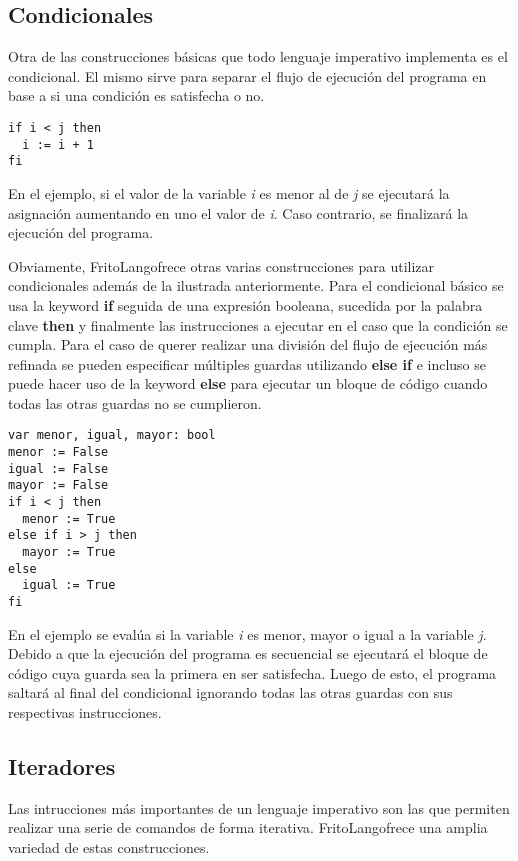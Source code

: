 \documentclass{article}
\newcommand{\Lang}{FritoLang} %
\begin{document}
\subsection{Condicionales}
Otra de las construcciones básicas que todo lenguaje imperativo implementa es el condicional.
El mismo sirve para separar el flujo de ejecución del programa en base a si una condición es satisfecha o no.

\begin{lstlisting}
if i < j then
  i := i + 1
fi
\end{lstlisting}

En el ejemplo, si el valor de la variable \textit{i} es menor al de \textit{j} se ejecutará la asignación aumentando en uno el valor de \textit{i}.
Caso contrario, se finalizará la ejecución del programa.

Obviamente, \Lang\space ofrece otras varias construcciones para utilizar condicionales además de la ilustrada anteriormente.
Para el condicional básico se usa la keyword \textbf{if} seguida de una expresión booleana, sucedida por la palabra clave \textbf{then} y finalmente las instrucciones a ejecutar en el caso que la condición se cumpla.
Para el caso de querer realizar una división del flujo de ejecución más refinada se pueden especificar múltiples guardas utilizando \textbf{else if} e incluso se puede hacer uso de la keyword \textbf{else} para ejecutar un bloque de código cuando todas las otras guardas no se cumplieron.

\begin{lstlisting}
var menor, igual, mayor: bool
menor := False
igual := False
mayor := False
if i < j then
  menor := True
else if i > j then
  mayor := True
else
  igual := True
fi
\end{lstlisting}

En el ejemplo se evalúa si la variable \textit{i} es menor, mayor o igual a la variable \textit{j}.
Debido a que la ejecución del programa es secuencial se ejecutará el bloque de código cuya guarda sea la primera en ser satisfecha.
Luego de esto, el programa saltará al final del condicional ignorando todas las otras guardas con sus respectivas instrucciones.

\subsection{Iteradores}
Las intrucciones más importantes de un lenguaje imperativo son las que permiten realizar una serie de comandos de forma iterativa.
\Lang\space ofrece una amplia variedad de estas construcciones.
\end{document}
